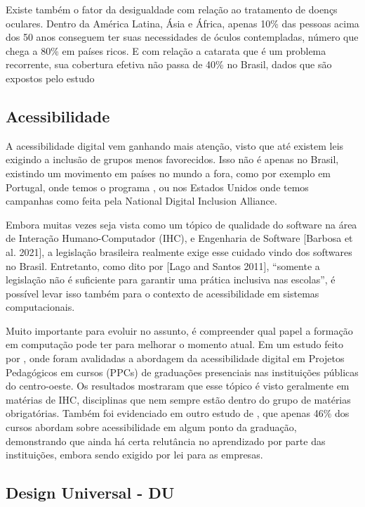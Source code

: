 Existe também o fator da desigualdade com relação ao tratamento de doençs oculares. Dentro da América Latina, Ásia e África, apenas 10\% das pessoas acima dos 50 anos conseguem ter suas necessidades de óculos contempladas, número que chega a 80\% em países ricos. E com relação a catarata que é um problema recorrente, sua cobertura efetiva não passa de 40\% no Brasil, dados que são expostos pelo estudo \citep{bourne2022}

\subsection*{Acessibilidade}

A acessibilidade digital vem ganhando mais atenção, visto que até existem leis exigindo a inclusão de grupos menos favorecidos. Isso não é apenas no Brasil, existindo um movimento em países no mundo a fora, como por exemplo em Portugal, onde temos o programa \citep{eusoudigital_pt}, ou nos Estados Unidos onde temos campanhas como \citep{digitalinclusionweek2025} feita pela National Digital Inclusion Alliance.

Embora muitas vezes seja vista como um tópico de qualidade do software na área de Interação Humano-Computador (IHC), e Engenharia de Software [Barbosa et al. 2021], a legislação brasileira realmente exige esse cuidado vindo dos softwares no Brasil. Entretanto, como dito por [Lago and Santos 2011], “somente a legislação não é suficiente para garantir uma prática inclusiva nas escolas”, é possível levar isso também para o contexto de acessibilidade em sistemas computacionais.

Muito importante para evoluir no assunto, é compreender qual papel a formação em computação pode ter para melhorar o momento atual. Em um estudo feito por \citep{wei}, onde foram avalidadas a abordagem da acessibilidade digital em Projetos Pedagógicos em cursos (PPCs) de graduações presenciais nas instituições públicas do centro-oeste. Os resultados mostraram que esse tópico é visto geralmente em matérias de IHC, disciplinas que nem sempre estão dentro do grupo de matérias obrigatórias. Também foi evidenciado em outro estudo de \citep{CAPAIHC}, que apenas 46\% dos cursos abordam sobre acessibilidade em algum ponto da graduação, demonstrando que ainda há certa relutância no aprendizado por parte das instituições, embora sendo exigido por lei para as empresas.

\subsection*{Design Universal - DU}

